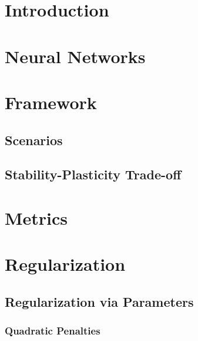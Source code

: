 \documentclass[12pt]{article}
\begin{document}
	\newpage
	\tableofcontents
	
	\newpage
	
	
	
	\section{Introduction}
	\label{intro}
	
	\section{Neural Networks}
	\label{nn}
	
	\section{Framework}
	\label{framework}
	
	\subsection{Scenarios}
	\label{scenarios}
	
	\subsection{Stability-Plasticity Trade-off}
	\label{cf}
	
	\section{Metrics}
	\label{metrics}
	
	\section{Regularization}
	\label{reg0}
	
	\subsection{Regularization via Parameters}
	\label{reg01}
	\subsubsection{Quadratic Penalties}
	\label{reg011}
	
\end{document}
